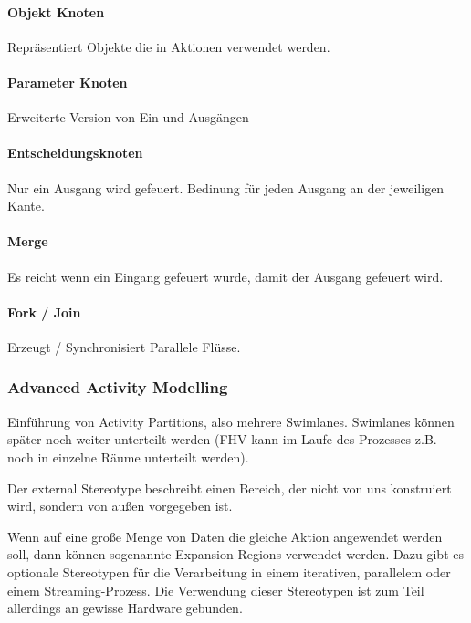 \paragraph{Objekt Knoten}
Repräsentiert Objekte die in Aktionen verwendet werden.


\paragraph{Parameter Knoten}
Erweiterte Version von Ein und Ausgängen


\paragraph{Entscheidungsknoten}
Nur ein Ausgang wird gefeuert. Bedinung für jeden Ausgang an der jeweiligen Kante.


\paragraph{Merge}
Es reicht wenn ein Eingang gefeuert wurde, damit der Ausgang gefeuert wird.


\paragraph{Fork / Join}
Erzeugt / Synchronisiert Parallele Flüsse. 


\subsubsection{Advanced Activity Modelling}
Einführung von Activity Partitions, also mehrere Swimlanes. Swimlanes können später noch weiter unterteilt werden (FHV kann im Laufe des Prozesses z.B. noch in einzelne Räume unterteilt werden). 

Der external Stereotype beschreibt einen Bereich, der nicht von uns konstruiert wird, sondern von außen vorgegeben ist.

Wenn auf eine große Menge von Daten die gleiche Aktion angewendet werden soll, dann können sogenannte Expansion Regions verwendet werden. Dazu gibt es optionale Stereotypen für die Verarbeitung in einem iterativen, parallelem oder einem Streaming-Prozess. Die Verwendung dieser Stereotypen ist zum Teil allerdings an gewisse Hardware gebunden.

